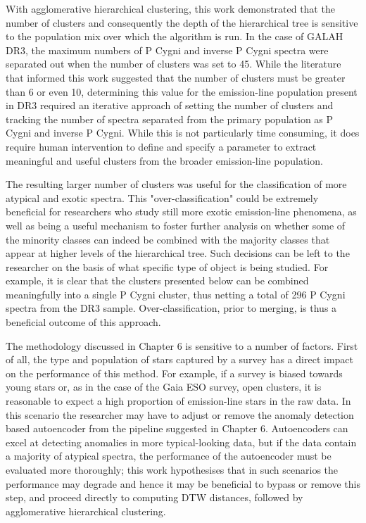 With agglomerative hierarchical clustering, this work demonstrated that the number of clusters and consequently the depth of the hierarchical tree is sensitive to the population mix over which the algorithm is run. In the case of GALAH DR3, the maximum numbers of P Cygni and inverse P Cygni spectra were separated out when the number of clusters was set to 45. While the literature that informed this work suggested that the number of clusters must be greater than 6 or even 10, determining this value for the emission-line population present in DR3 required an iterative approach of setting the number of clusters and tracking the number of spectra separated from the primary population as P Cygni and inverse P Cygni. While this is not particularly time consuming, it does require human intervention to define and specify a parameter to extract meaningful and useful clusters from the broader emission-line population. 

The resulting larger number of clusters was useful for the classification of more atypical and exotic spectra. This "over-classification" could be extremely beneficial for researchers who study still more exotic emission-line phenomena, as well as being a useful mechanism to foster further analysis on whether some of the minority classes can indeed be combined with the majority classes that appear at higher levels of the hierarchical tree. Such decisions can be left to the researcher on the basis of what specific type of object is being studied. For example, it is clear that the clusters presented below can be combined meaningfully into a single P Cygni cluster, thus netting a total of 296 P Cygni spectra from the DR3 sample. Over-classification, prior to merging, is thus a beneficial outcome of this approach. 

The methodology discussed in Chapter 6 is sensitive to a number of factors. First of all, the type and population of stars captured by a survey has a direct impact on the performance of this method. For example, if a survey is biased towards young stars or, as in the case of the Gaia ESO survey, open clusters, it is reasonable to expect a high proportion of emission-line stars in the raw data. In this scenario the researcher may have to adjust or remove the anomaly detection based autoencoder from the pipeline suggested in Chapter 6. Autoencoders can excel at detecting anomalies in more typical-looking data, but if the data contain a majority of atypical spectra, the performance of the autoencoder must be evaluated more thoroughly; this work hypothesises that in such scenarios the performance may degrade and hence it may be beneficial to bypass or remove this step, and proceed directly to computing DTW distances, followed by agglomerative hierarchical clustering. 

